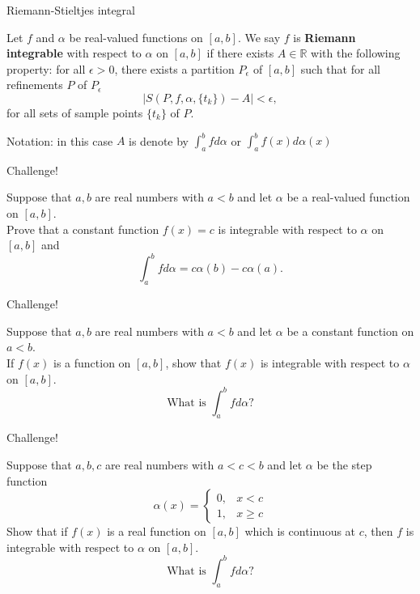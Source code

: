 \documentclass{beamer}
\begin{document}
\begin{frame}{Riemann-Stieltjes integral}
\begin{defn}
\pause
Let $f$ and $\alpha$ be real-valued functions on $[a,b]$.
\pause
We say $f$ is \textbf{Riemann integrable} with respect to $\alpha$ on $[a,b]$ if there exists $A\in\mathbb{R}$ with the following property:
\pause 
for all $\epsilon > 0$, there exists a partition $P_\epsilon$ of $[a,b]$ such that for all refinements $P$ of $P_\epsilon$
$$|S(P,f,\alpha,\{t_k\}) - A| < \epsilon,$$
for all sets of sample points $\{t_k\}$ of $P$.
\end{defn}
\pause
Notation: in this case $A$ is denote by $\int_a^b f d\alpha$ or $\int_a^b f(x) d\alpha(x)$
\end{frame}

\begin{frame}{Challenge!}
\begin{prob}
Suppose that $a,b$ are real numbers with $a<b$ and let $\alpha$ be a real-valued function on $[a,b]$.\\
Prove that a constant function $f(x) = c$ is integrable with respect to $\alpha$ on $[a,b]$ and
$$\int_a^b fd\alpha = c\alpha(b)-c\alpha(a).$$
\end{prob}
\end{frame}

\begin{frame}{Challenge!}
\begin{prob}
Suppose that $a,b$ are real numbers with $a<b$ and let $\alpha$ be a constant function on $a<b$.\\
If $f(x)$ is a function on $[a,b]$, show that $f(x)$ is integrable with respect to $\alpha$ on $[a,b]$.\\
$$\text{What is $\int_a^b fd\alpha$?}$$
\end{prob}
\end{frame}

\begin{frame}{Challenge!}
\begin{prob}
Suppose that $a,b,c$ are real numbers with $a<c<b$ and let $\alpha$ be the step function
$$\alpha(x) = \left\lbrace\begin{array}{cc}
0, & x < c\\
1, & x \geq c
\end{array}\right.$$
Show that if $f(x)$ is a real function on $[a,b]$ which is continuous at $c$, then $f$ is integrable with respect to $\alpha$ on $[a,b]$.\\
$$\text{What is $\int_a^b fd\alpha$?}$$
\end{prob}
\end{frame}
\end{document}
